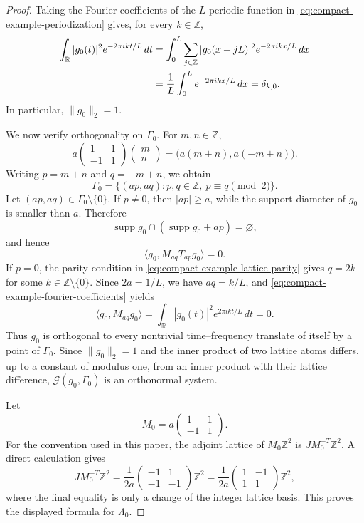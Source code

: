 \documentclass[11pt,reqno]{amsart}
\numberwithin{equation}{section}
\theoremstyle{definition}
\theoremstyle{remark}
\newcommand{\R}{\mathbb R}
\newcommand{\Z}{\mathbb Z}
\newcommand{\supp}{\operatorname{supp}}
\newcommand{\G}{\mathcal G}
\newcommand{\ip}[2]{\langle #1,#2\rangle}
\newcommand{\norm}[1]{\lVert #1\rVert}
\begin{document}
\begin{proof}
Taking the Fourier coefficients of the $L$-periodic function in
\eqref{eq:compact-example-periodization} gives, for every $k\in\Z$,
\begin{align}
 \int_{\R}|g_0(t)|^2e^{-2\pi i kt/L}\,dt
 &=\int_0^L\sum_{j\in\Z}|g_0(x+jL)|^2e^{-2\pi i kx/L}\,dx \notag\\
 &=\frac1L\int_0^L e^{-2\pi i kx/L}\,dx
 =\delta_{k,0}.
 \label{eq:compact-example-fourier-coefficients}
\end{align}
In particular, $\norm{g_0}_2=1$.

We now verify orthogonality on $\Gamma_0$.  For $m,n\in\Z$,
\[
 a\begin{pmatrix}1&1\\-1&1\end{pmatrix}
 \begin{pmatrix}m\\n\end{pmatrix}
 =\bigl(a(m+n),a(-m+n)\bigr).
\]
Writing $p=m+n$ and $q=-m+n$, we obtain
\begin{equation}\label{eq:compact-example-lattice-parity}
 \Gamma_0
 =\{(ap,aq):p,q\in\Z,\ p\equiv q\pmod2\}.
\end{equation}
Let $(ap,aq)\in\Gamma_0\setminus\{0\}$.  If $p\ne0$, then
$|ap|\ge a$, while the support diameter of $g_0$ is smaller than $a$.
Therefore
\[
 \supp g_0\cap(\supp g_0+ap)=\varnothing,
\]
and hence
\[
 \ip{g_0}{M_{aq}T_{ap}g_0}=0.
\]
If $p=0$, the parity condition in
\eqref{eq:compact-example-lattice-parity} gives $q=2k$ for some
$k\in\Z\setminus\{0\}$.  Since $2a=1/L$, we have $aq=k/L$, and
\eqref{eq:compact-example-fourier-coefficients} yields
\[
 \ip{g_0}{M_{aq}g_0}
 =\int_{\R}|g_0(t)|^2e^{2\pi i kt/L}\,dt=0.
\]
Thus $g_0$ is orthogonal to every nontrivial time--frequency translate of
itself by a point of $\Gamma_0$.  Since $\norm{g_0}_2=1$ and the inner
product of two lattice atoms differs, up to a constant of modulus one, from
an inner product with their lattice difference, $\G(g_0,\Gamma_0)$ is an
orthonormal system.

Let
\[
 M_0=a\begin{pmatrix}1&1\\-1&1\end{pmatrix}.
\]
For the convention used in this paper, the adjoint lattice of
$M_0\Z^2$ is $JM_0^{-T}\Z^2$.  A direct calculation gives
\[
 JM_0^{-T}\Z^2
 =\frac1{2a}\begin{pmatrix}-1&1\\-1&-1\end{pmatrix}\Z^2
 =\frac1{2a}\begin{pmatrix}1&-1\\1&1\end{pmatrix}\Z^2,
\]
where the final equality is only a change of the integer lattice basis.
This proves the displayed formula for $\Lambda_0$.


\end{proof}
\end{document}
